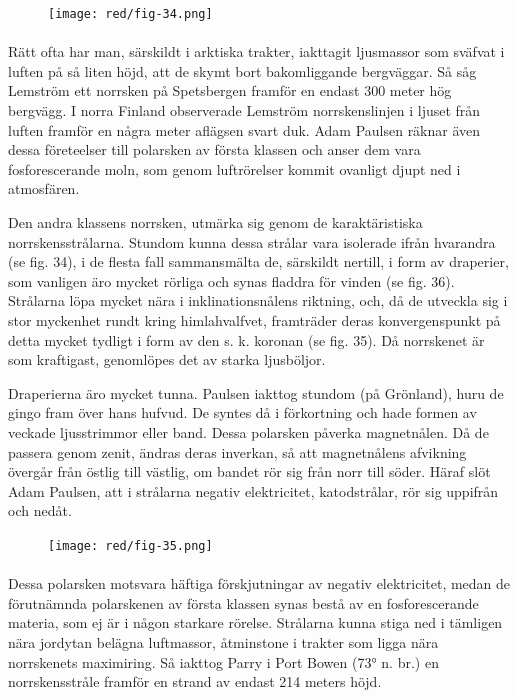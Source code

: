 \documentclass[a4paper, 12pt, oneside, swedish]{article}
\begin{document}
\begin{figure}[H]
\centering
\texttt{[image: red/fig-34.png]}
\caption{}
\end{figure}
\paragraph{}
Rätt ofta har man, särskildt i arktiska trakter, iakttagit ljusmassor som sväfvat i luften på så liten höjd, att de skymt bort bakomliggande bergväggar. Så såg Lemström ett norrsken på Spetsbergen framför en endast 300 meter hög bergvägg. I norra Finland observerade Lemström norrskenslinjen i ljuset från luften framför en några meter aflägsen svart duk. Adam Paulsen räknar även dessa företeelser till polarsken av första klassen och anser dem vara fosforescerande moln, som genom luftrörelser kommit ovanligt djupt ned i atmosfären.

Den andra klassens norrsken, utmärka sig genom de karaktäristiska norrskensstrålarna. Stundom kunna dessa strålar vara isolerade ifrån hvarandra (se fig. 34), i de flesta fall sammansmälta de, särskildt nertill, i form av draperier, som vanligen äro mycket rörliga och synas fladdra för vinden (se fig. 36). Strålarna löpa mycket nära i inklinationsnålens riktning, och, då de utveckla sig i stor myckenhet rundt kring himlahvalfvet, framträder deras konvergenspunkt på detta mycket tydligt i form av den s. k. koronan (se fig. 35). Då norrskenet är som kraftigast, genomlöpes det av starka ljusböljor.

Draperierna äro mycket tunna. Paulsen iakttog stundom (på Grönland), huru de gingo fram över hans hufvud. De syntes då i förkortning och hade formen av veckade ljusstrimmor eller band. Dessa polarsken påverka magnetnålen. Då de passera genom zenit, ändras deras inverkan, så att magnetnålens afvikning övergår från östlig till västlig, om bandet rör sig från norr till söder. Häraf slöt Adam Paulsen, att i strålarna negativ elektricitet, katodstrålar, rör sig uppifrån och nedåt.

\begin{figure}[H]
\centering
\texttt{[image: red/fig-35.png]}
\caption{}
\end{figure}
\paragraph{}
Dessa polarsken motsvara häftiga förskjutningar av negativ elektricitet, medan de förutnämnda polarskenen av första klassen synas bestå av en fosforescerande materia, som ej är i någon starkare rörelse. Strålarna kunna stiga ned i tämligen nära jordytan belägna luftmassor, åtminstone i trakter som ligga nära norrskenets maximiring. Så iakttog Parry i Port Bowen (73° n. br.) en norrskensstråle framför en strand av endast 214 meters höjd.
\end{document}
